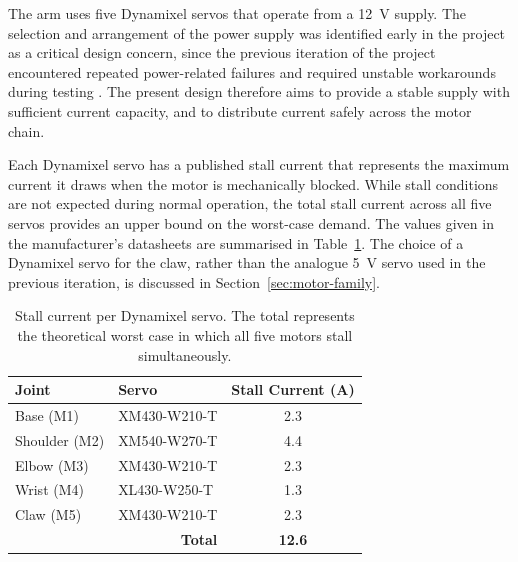 \label{sec:power-architecture}

The arm uses five Dynamixel servos that operate from a 12~V supply. 
The selection and arrangement of the power supply was identified 
early in the project as a critical design concern, since the previous 
iteration of the project encountered repeated power-related failures 
and required unstable workarounds during testing \cite{sortify}. The 
present design therefore aims to provide a stable supply with 
sufficient current capacity, and to distribute current safely across 
the motor chain.

Each Dynamixel servo has a published stall current that represents 
the maximum current it draws when the motor is mechanically blocked. 
While stall conditions are not expected during normal operation, the 
total stall current across all five servos provides an upper bound 
on the worst-case demand. The values given in the manufacturer's 
datasheets \cite{robotis_dynamixel} are summarised in 
Table~\ref{tab:stall_currents}. The choice of a Dynamixel servo for 
the claw, rather than the analogue 5~V servo used in the previous 
iteration, is discussed in Section~\ref{sec:motor-family}.

\begin{table}[htbp]
    \centering
    \renewcommand{\arraystretch}{1.3}
    \begin{tabular}{|l|l|c|}
        \hline
        \textbf{Joint} & \textbf{Servo} & \textbf{Stall Current (A)} \\
        \hline
        Base (M1)     & XM430-W210-T & 2.3 \\
        \hline
        Shoulder (M2) & XM540-W270-T & 4.4 \\
        \hline
        Elbow (M3)    & XM430-W210-T & 2.3 \\
        \hline
        Wrist (M4)    & XL430-W250-T & 1.3 \\
        \hline
        Claw (M5)     & XM430-W210-T & 2.3 \\
        \hline
        \multicolumn{2}{|r|}{\textbf{Total}} & \textbf{12.6} \\
        \hline
    \end{tabular}
    \caption{Stall current per Dynamixel servo. The total represents 
    the theoretical worst case in which all five motors stall 
    simultaneously.}
    \label{tab:stall_currents}
\end{table}

